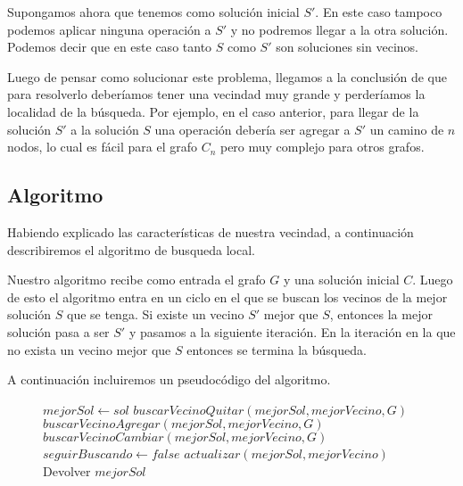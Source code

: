 Supongamos ahora que tenemos como solución inicial $S'$. En este caso tampoco podemos aplicar ninguna operación a $S'$ y no podremos llegar a la otra solución. Podemos decir que en este caso tanto $S$ como $S'$ son soluciones sin vecinos.

Luego de pensar como solucionar este problema, llegamos a la conclusión de que para resolverlo deberíamos tener una vecindad muy grande y perderíamos la localidad de la búsqueda. Por ejemplo, en el caso anterior, para llegar de la solución $S'$ a la solución $S$ una operación debería ser agregar a $S'$ un camino de $n$ nodos, lo cual es fácil para el grafo $C_n$ pero muy complejo para otros grafos.

\subsection{Algoritmo}

Habiendo explicado las características de nuestra vecindad, a continuación describiremos el algoritmo de busqueda local.

Nuestro algoritmo recibe como entrada el grafo $G$ y una solución inicial $C$. Luego de esto el algoritmo entra en un ciclo en el que se buscan los vecinos de la mejor solución $S$ que se tenga. Si existe un vecino $S'$ mejor que $S$, entonces la mejor solución pasa a ser $S'$ y pasamos a la siguiente iteración. En la iteración en la que no exista un vecino mejor que $S$ entonces se termina la búsqueda.

A continuación incluiremos un pseudocódigo del algoritmo.
\begin{center}
 \begin{figure}[H]
  \begin{pseudo}
   \State $mejorSol \leftarrow sol$
      \State $buscarVecinoQuitar(mejorSol, mejorVecino, G)$
      \State $buscarVecinoAgregar(mejorSol, mejorVecino, G)$
      \State $buscarVecinoCambiar(mejorSol, mejorVecino, G)$
	\State $seguirBuscando \leftarrow false$
      \Else
	\State $actualizar(mejorSol, mejorVecino)$
      \EndIf
      \State Devolver $mejorSol$
   \EndWhile
   \EndProcedure
  \end{pseudo}
 \end{figure}
\end{center}

